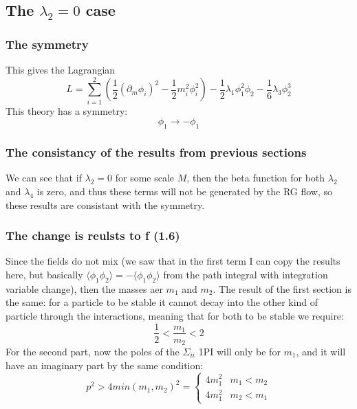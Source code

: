 \documentclass{article}
\begin{document}
\subsection{The $\lambda_2 = 0$ case}
\subsubsection{The symmetry}
This gives the Lagrangian
\begin{equation}
    L = \sum_{i=1}^2 \left(\frac{1}{2}\left(\partial_m \phi_i\right)^2 - \frac{1}{2}m_i^2\phi_i^2\right) - \frac{1}{2}\lambda_1\phi_1^2\phi_2 - \frac{1}{6}\lambda_3\phi_2^3
\end{equation}
This theory has a symmetry:
\begin{equation}
    \phi_1 \rightarrow -\phi_1
\end{equation}
\subsubsection{The consistancy of the results from previous sections}
We can see that if $\lambda_2 = 0$ for some scale $M$, then the beta function for both $\lambda_2$ and $\lambda_4$ is zero, and thus these terms will not be generated by the RG flow, so these results are consistant with the symmetry.
\subsubsection{The change is reulsts to f (1.6)}
Since the fields do not mix (we saw that in the first term I can copy the results here, but basically $\langle \phi_1 \phi_2 \rangle = -\langle \phi_1 \phi_2 \rangle$ from the path integral with integration variable change), then the masses aer $m_1$ and $m_2$.
\newline
The result of the first section is the same: for a particle to be stable it cannot decay into the other kind of particle through the interactions, meaning that for both to be stable we require:
\begin{equation}
    \frac{1}{2} < \frac{m_1}{m_2} < 2
\end{equation}
For the second part, now the poles of the $\Sigma_{ii}$ 1PI will only be for $m_1$, and it will have an imaginary part by the same condition:
\begin{equation}
    p^2 > 4min(m_1, m_2)^2 = \begin{cases}
        4m_1^2 & m_1 < m_2 \\ 4m_1^2 & m_2 < m_1
    \end{cases}
\end{equation}
\end{document}
